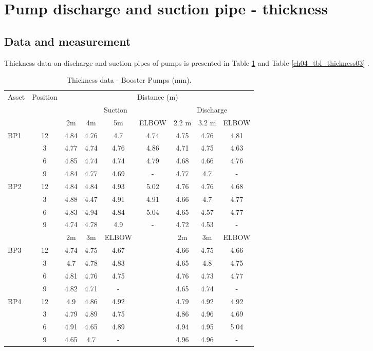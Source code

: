 %
\section{Pump discharge and suction pipe - thickness} \label{ch04mech01}
\subsection{Data and measurement}
Thickness data on discharge and suction pipes of pumps is presented in Table \ref{ch04_tbl_thickness02} and Table \ref{ch04_tbl_thickness03} .

\begin{table}[h]
	\caption{Thickness data - Booster Pumps (mm).}
	\label{ch04_tbl_thickness02}
	{\footnotesize
\begin{tabular}{l|c|c|c|c|c|c|c|c}
\hline
Asset & Position & \multicolumn{7}{c}{Distance (m)} \\ 
\cline{3-9}
&  & \multicolumn{4}{c|}{Suction} & \multicolumn{3}{c}{Discharge} \\ 
\cline{3-9}
&  & 2m & 4m & 5m & ELBOW & 2.2 m & 3.2 m & ELBOW \\ 
\hline
BP1 & 12 & 4.84 & 4.76 & 4.7 & 4.74 & 4.75 & 4.76 & 4.81 \\ 
& 3 & 4.77 & 4.74 & 4.76 & 4.86 & 4.71 & 4.75 & 4.63 \\ 
& 6 & 4.85 & 4.74 & 4.74 & 4.79 & 4.68 & 4.66 & 4.76 \\ 
& 9 & 4.84 & 4.77 & 4.69 & - & 4.77 & 4.7 & - \\ 
\hline
BP2 & 12 & 4.84 & 4.84 & 4.93 & 5.02 & 4.76 & 4.76 & 4.68 \\ 
& 3 & 4.88 & 4.47 & 4.91 & 4.91 & 4.66 & 4.7 & 4.77 \\ 
& 6 & 4.83 & 4.94 & 4.84 & 5.04 & 4.65 & 4.57 & 4.77 \\ 
& 9 & 4.74 & 4.78 & 4.9 & - & 4.72 & 4.53 & - \\ 
\hline
&  & 2m & 3m & ELBOW &  & 2m & 3m & ELBOW \\ 
\hline
BP3 & 12 & 4.74 & 4.75 & 4.67 &  & 4.66 & 4.75 & 4.66 \\ 
& 3 & 4.7 & 4.78 & 4.83 &  & 4.65 & 4.8 & 4.75 \\ 
& 6 & 4.81 & 4.76 & 4.75 &  & 4.76 & 4.73 & 4.77 \\ 
& 9 & 4.82 & 4.71 & - &  & 4.65 & 4.74 & - \\ 
\hline
BP4 & 12 & 4.9 & 4.86 & 4.92 &  & 4.79 & 4.92 & 4.92 \\ 
& 3 & 4.79 & 4.89 & 4.75 &  & 4.86 & 4.96 & 4.69 \\ 
& 6 & 4.91 & 4.65 & 4.89 &  & 4.94 & 4.95 & 5.04 \\ 
& 9 & 4.65 & 4.7 & - &  & 4.96 & 4.96 & - \\ 
\hline
\end{tabular}

	}
\end{table}


